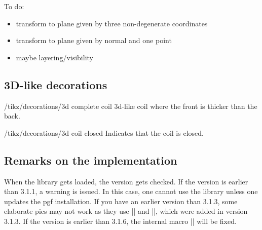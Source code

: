 \documentclass[a4paper,fleqn]{ltxdoc}
\begin{document}
\begin{codeexample}[width=3cm,preamble={\usetikzlibrary{3dtools}}]
\end{codeexample}

To do:
\begin{itemize}
 \item transform to plane given by three non-degenerate coordinates
 \item transform to plane given by normal and one point
 \item maybe layering/visibility
\end{itemize}

\subsection{3D-like decorations}

\begin{key}{/tikz/decorations/3d complete  coil}
        3d-like coil where the front is thicker than the back.
\end{key}

\begin{key}{/tikz/decorations/3d coil closed}
        Indicates that the coil is closed.
\end{key}

\begin{codeexample}[width=8cm,preamble={\usetikzlibrary{3dtools}}]
\end{codeexample}


\subsection{Remarks on the implementation}

When the library gets loaded, the version gets checked. If the version is
earlier than 3.1.1, a warning is issued. In this case, one cannot use the
library unless one updates the pgf installation. If you have an earlier version
than 3.1.3, some elaborate pics may not work as they use  |\pgfutil@pushmacro|
and |\pgfutil@popmacro|, which were added in version 3.1.3. If the version is
earlier than 3.1.6, the internal macro |\pgfutil@pushmacro| will be fixed.  
\end{document}

